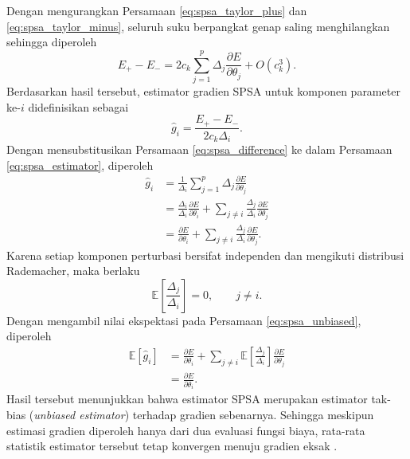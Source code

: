 Dengan mengurangkan Persamaan \eqref{eq:spsa_taylor_plus} dan \eqref{eq:spsa_taylor_minus}, seluruh suku berpangkat genap saling menghilangkan sehingga diperoleh
\begin{equation}
E_+ - E_-
=
2c_k
\sum_{j=1}^{p}
\Delta_j
\frac{\partial E}{\partial \theta_j}
+
O(c_k^3).
\label{eq:spsa_difference}
\end{equation}
Berdasarkan hasil tersebut, estimator gradien SPSA untuk komponen parameter ke-$i$ didefinisikan sebagai
\begin{equation}
\hat g_i
=
\frac{E_+-E_-}
{2c_k\Delta_i}.
\label{eq:spsa_estimator}
\end{equation}
Dengan mensubstitusikan Persamaan \eqref{eq:spsa_difference} ke dalam Persamaan \eqref{eq:spsa_estimator}, diperoleh
\begin{equation}
\begin{split}
\hat g_i
&=
\frac{1}{\Delta_i}
\sum_{j=1}^{p}
\Delta_j
\frac{\partial E}{\partial\theta_j}
\\
&=
\frac{\Delta_i}{\Delta_i}
\frac{\partial E}{\partial\theta_i}
+
\sum_{j\neq i}
\frac{\Delta_j}{\Delta_i}
\frac{\partial E}{\partial\theta_j}
\\
&=
\frac{\partial E}{\partial\theta_i}
+
\sum_{j\neq i}
\frac{\Delta_j}{\Delta_i}
\frac{\partial E}{\partial\theta_j}.
\end{split}
\label{eq:spsa_unbiased}
\end{equation}
Karena setiap komponen perturbasi bersifat independen dan mengikuti distribusi Rademacher, maka berlaku
\begin{equation}
\mathbb{E}
\left[
\frac{\Delta_j}{\Delta_i}
\right]
=
0,
\qquad
j\neq i.
\end{equation}
Dengan mengambil nilai ekspektasi pada Persamaan \eqref{eq:spsa_unbiased}, diperoleh
\begin{equation}
\begin{split}
\mathbb{E}[\hat g_i]
&=
\frac{\partial E}{\partial\theta_i}
+
\sum_{j\neq i}
\mathbb{E}
\left[
\frac{\Delta_j}{\Delta_i}
\right]
\frac{\partial E}{\partial\theta_j}
\\
&=
\frac{\partial E}{\partial\theta_i}.
\end{split}
\end{equation}
Hasil tersebut menunjukkan bahwa estimator SPSA merupakan estimator tak-bias (\textit{unbiased estimator}) terhadap gradien sebenarnya. Sehingga meskipun estimasi gradien diperoleh hanya dari dua evaluasi fungsi biaya, rata-rata statistik estimator tersebut tetap konvergen menuju gradien eksak \cite{spall_implementation_1998}.

